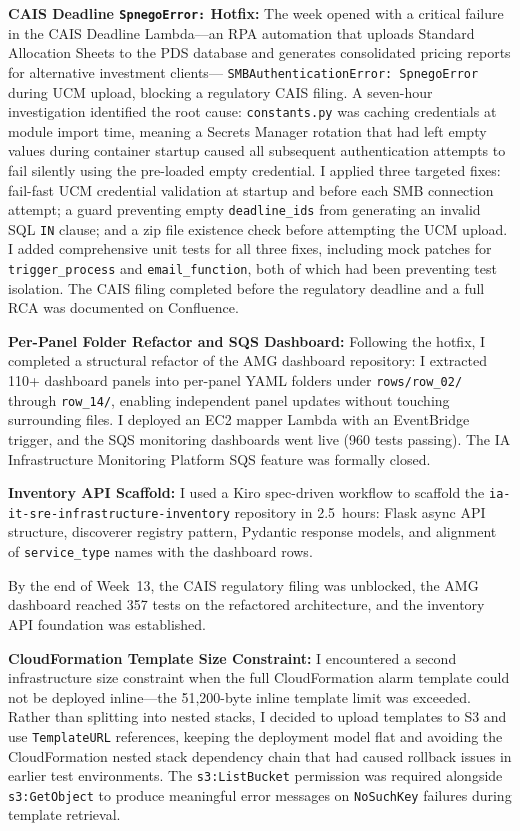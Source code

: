 \textbf{CAIS Deadline \texttt{SpnegoError:} Hotfix:} 
The week
opened with a critical failure in the CAIS Deadline Lambda---an RPA automation that uploads Standard Allocation Sheets to the PDS database and generates consolidated pricing reports for alternative investment clients---
\texttt{SMBAuthenticationError: SpnegoError} during UCM upload, blocking
a regulatory CAIS filing. A seven-hour investigation identified
the root cause: \texttt{constants.py} was caching credentials at module
import time, meaning a Secrets Manager rotation that had left empty values
during container startup caused all subsequent authentication attempts to
fail silently using the pre-loaded empty credential. I applied three targeted fixes: fail-fast UCM credential validation at startup and before each SMB connection attempt; a guard preventing empty
\texttt{deadline\_ids} from generating an invalid SQL \texttt{IN} clause;
and a zip file existence check before attempting the UCM upload. I added
comprehensive unit tests for all three fixes, including mock patches for
\texttt{trigger\_process} and \texttt{email\_function}, both of which had been
preventing test isolation. The CAIS filing completed before the regulatory
deadline and a full RCA was documented on Confluence.

\textbf{Per-Panel Folder Refactor and SQS Dashboard:} 
Following
the hotfix, I completed a structural refactor of the AMG dashboard repository:
I extracted 110+ dashboard panels into per-panel YAML folders under
\texttt{rows/row\_02/} through \texttt{row\_14/}, enabling independent
panel updates without touching surrounding files. I deployed an EC2 mapper
Lambda with an EventBridge trigger, and the SQS monitoring dashboards
went live (960 tests passing). The IA Infrastructure Monitoring Platform SQS feature was
formally closed.

\textbf{Inventory API Scaffold:} 
I used a Kiro spec-driven workflow to scaffold the
\texttt{ia-it-sre-infrastructure-inventory} repository in 2.5~hours: Flask async API structure, discoverer registry
pattern, Pydantic response models, and alignment of \texttt{service\_type}
names with the dashboard rows.

By the end of Week~13, the CAIS regulatory filing was unblocked, the AMG dashboard
reached 357 tests on the refactored architecture, and the inventory API
foundation was established.

\textbf{CloudFormation Template Size Constraint:} 
I encountered a second infrastructure
size constraint when the full CloudFormation
alarm template could not be deployed inline---the 51,200-byte inline
template limit was exceeded. Rather than splitting into nested stacks,
I decided to upload templates to S3 and use
\texttt{TemplateURL} references, keeping the deployment model flat and
avoiding the CloudFormation nested stack dependency chain that had caused rollback
issues in earlier test environments. The \texttt{s3:ListBucket} permission
was required alongside \texttt{s3:GetObject} to produce meaningful error
messages on \texttt{NoSuchKey} failures during template retrieval.


